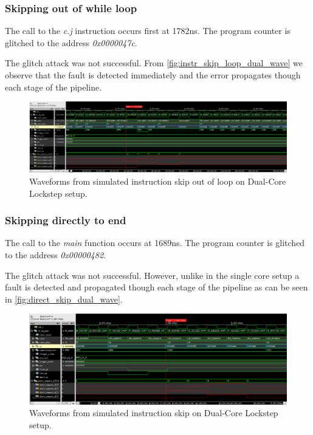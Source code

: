 \subsubsection{Skipping out of while loop}

The call to the \textit{c.j} instruction occurs first at 1782ns. The program counter is glitched to the address \textit{0x0000047c}.

The glitch attack was not successful. From \autoref{fig:instr_skip_loop_dual_wave} we observe that the fault is detected immediately and the error propagates though each stage of the pipeline. 

\begin{figure}[h!]
    \centering
    \includegraphics[width=\textwidth]{docs/images/instr_skip_loop_dual_core.png}
    \caption{Waveforms from simulated instruction skip out of loop on Dual-Core Lockstep setup.}
    \label{fig:instr_skip_loop_dual_wave}
\end{figure}

\subsubsection{Skipping directly to end}

The call to the \textit{main} function occurs at 1689ns. The program counter is glitched to the address \textit{0x00000482}.

The glitch attack was not successful. However, unlike in the single core setup a fault is detected and propagated though each stage of the pipeline as can be seen in \autoref{fig:direct_skip_dual_wave}. 

\begin{figure}[h!]
    \centering
    \includegraphics[width=\textwidth]{docs/images/direct_skip_dual_core.png}
    \caption{Waveforms from simulated instruction skip on Dual-Core Lockstep setup.}
    \label{fig:direct_skip_dual_wave}
\end{figure}


